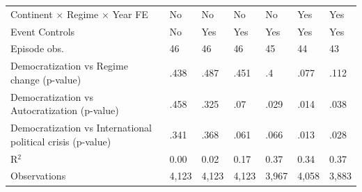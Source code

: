 \begin{tabularx}{\linewidth}{@{} l*{6}{Y} @{}}
Continent $\times$ Regime $\times$ Year FE&          No         &          No         &          No         &          No         &         Yes         &         Yes         \\
Event Controls      &          No         &         Yes         &         Yes         &         Yes         &         Yes         &         Yes         \\
Episode obs.        &          46         &          46         &          46         &          45         &          44         &          43         \\
Democratization vs Regime change (p-value)&        .438         &        .487         &        .451         &          .4         &        .077         &        .112         \\
Democratization vs Autocratization (p-value)&        .458         &        .325         &         .07         &        .029         &        .014         &        .038         \\
Democratization vs International political crisis (p-value)&        .341         &        .368         &        .061         &        .066         &        .013         &        .028         \\
R$^2$               &        0.00         &        0.02         &        0.17         &        0.37         &        0.34         &        0.37         \\
Observations        &       4,123         &       4,123         &       4,123         &       3,967         &       4,058         &       3,883         \\
\bottomrule
\end{tabularx}
